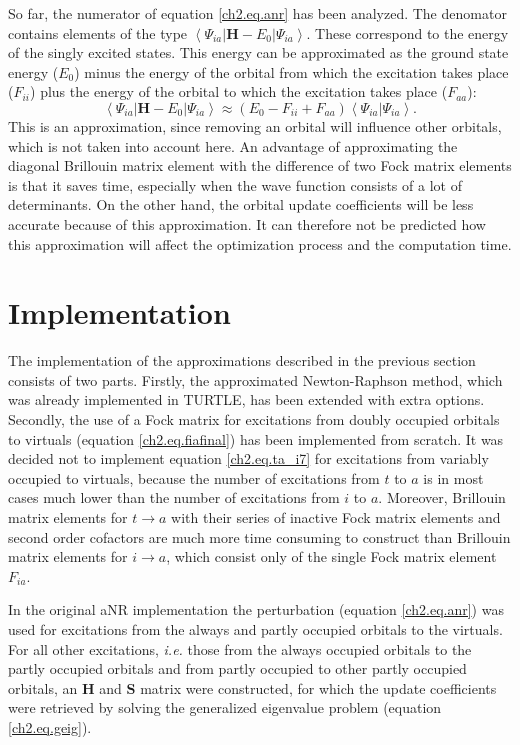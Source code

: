So far, the numerator of equation \ref{ch2.eq.anr} has been analyzed. The denomator contains elements of the type $\left< \Psi_{ia} | \mathbf{H}-E_0 | \Psi_{ia} \right>$. These correspond to the energy of the singly excited states. This energy can be approximated as the ground state energy ($E_0$) minus the energy of the orbital from which the excitation takes place ($F_{ii}$) plus the energy of the orbital to which the excitation takes place ($F_{aa}$):
\begin{equation}
\left< \Psi_{ia} | \mathbf{H}-E_0 | \Psi_{ia} \right> \approx (E_0 - F_{ii} + F_{aa})\left< \Psi_{ia} | \Psi_{ia} \right>.
\label{ch2.eq.cheapdiag}
\end{equation}
This is an approximation, since removing an orbital will influence other orbitals, which is not taken into account here. An advantage of approximating the diagonal Brillouin matrix element with the difference of two Fock matrix elements is that it saves time, especially when the wave function consists of a lot of determinants. On the other hand, the orbital update coefficients will be less accurate because of this approximation. It can therefore not be predicted how this approximation will affect the optimization process and the computation time.

\section{\label{ch2.sec.implementation}Implementation}

The implementation of the approximations described in the previous section consists of two parts. Firstly, the approximated Newton-Raphson method, which was already implemented in TURTLE, has been extended with extra options. Secondly, the use of a Fock matrix for excitations from doubly occupied orbitals to virtuals (equation \ref{ch2.eq.fiafinal}) has been implemented from scratch. It was decided not to implement equation \ref{ch2.eq.ta_i7} for excitations from variably occupied to virtuals, because the number of excitations from $t$ to $a$ is in most cases much lower than the number of excitations from $i$ to $a$. Moreover, Brillouin matrix elements for $t \rightarrow a$ with their series of inactive Fock matrix elements and second order cofactors are much more time consuming to construct than Brillouin matrix elements for $i \rightarrow a$, which consist only of the single Fock matrix element $F_{ia}$.

In the original aNR implementation the perturbation (equation \ref{ch2.eq.anr}) was used for excitations from the always and partly occupied orbitals to the virtuals. For all other excitations, \textit{i.e.} those from the always occupied orbitals to the partly occupied orbitals and from partly occupied to other partly occupied orbitals, an $\mathbf{H}$ and $\mathbf{S}$ matrix were constructed, for which the update coefficients were retrieved by solving the generalized eigenvalue problem (equation \ref{ch2.eq.geig}). 

